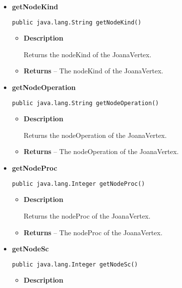 {{{{{{{{{{{{{{{{{{\begin{itemize}
{\begin{itemize}
{Returns the nodeEr of the JoanaVertex.
}
\item{{\bf  Returns} -- 
The nodeEr of the JoanaVertex. 
}%
\end{itemize}
}%
\item{ 
{\bf  getNodeKind}\\
\begin{lstlisting}[frame=none]
public java.lang.String getNodeKind()\end{lstlisting} %
\begin{itemize}
\item{
{\bf  Description}

Returns the nodeKind of the JoanaVertex.
}
\item{{\bf  Returns} -- 
The nodeKind of the JoanaVertex. 
}%
\end{itemize}
}%
\item{ 
{\bf  getNodeOperation}\\
\begin{lstlisting}[frame=none]
public java.lang.String getNodeOperation()\end{lstlisting} %
\begin{itemize}
\item{
{\bf  Description}

Returns the nodeOperation of the JoanaVertex.
}
\item{{\bf  Returns} -- 
The nodeOperation of the JoanaVertex. 
}%
\end{itemize}
}%
\item{ 
{\bf  getNodeProc}\\
\begin{lstlisting}[frame=none]
public java.lang.Integer getNodeProc()\end{lstlisting} %
\begin{itemize}
\item{
{\bf  Description}

Returns the nodeProc of the JoanaVertex.
}
\item{{\bf  Returns} -- 
The nodeProc of the JoanaVertex. 
}%
\end{itemize}
}%
\item{ 
{\bf  getNodeSc}\\
\begin{lstlisting}[frame=none]
public java.lang.Integer getNodeSc()\end{lstlisting} %
\begin{itemize}
\item{
{\bf  Description}

}
\end{itemize}}
\end{itemize}}}}}}}}}}}}}}}}}}}
